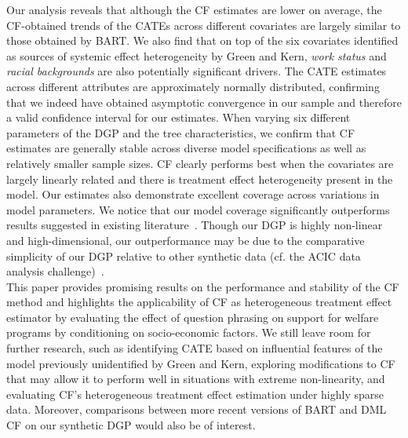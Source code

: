 \documentclass[12pt]{article}
\begin{document}
Our analysis reveals that although the CF estimates are lower on average, the
CF-obtained trends of the CATEs across different covariates are largely similar
to those obtained by BART. We also find that on top of the six covariates
identified as sources of systemic effect heterogeneity by Green and Kern,
\textit{work status} and \textit{racial backgrounds} are also potentially
significant drivers. The CATE estimates across different attributes are
approximately normally distributed, confirming that we indeed have obtained
asymptotic convergence in our sample and therefore a valid confidence interval
for our estimates. When varying six different parameters of the DGP and the tree
characteristics, we confirm that CF estimates are generally stable across
diverse model specifications as well as relatively smaller sample sizes. CF
clearly performs best when the covariates are largely linearly related and there
is treatment effect heterogeneity present in the model. Our estimates also
demonstrate excellent coverage across variations in model parameters. We notice
that our model coverage significantly outperforms results suggested in existing
literature~\cite{CarvalhoHahnMurray}. Though our DGP is highly non-linear and
high-dimensional, our outperformance may be due to the comparative simplicity of
our DGP relative to other synthetic data (cf. the ACIC data analysis
challenge)~\cite{dorieACIC}. \\

This paper provides promising results on the performance and stability of the CF
method and highlights the applicability of CF as heterogeneous treatment effect
estimator by evaluating the effect of question phrasing on support for welfare
programs by conditioning on socio-economic factors. We still leave room for
further research, such as identifying CATE based on influential features of the
model previously unidentified by Green and Kern, exploring modifications to CF
that may allow it to perform well in situations with extreme non-linearity, and
evaluating CF's heterogeneous treatment effect estimation under highly sparse
data. Moreover, comparisons between more recent versions of BART and DML CF on
our synthetic DGP would also be of interest.
\end{document}
